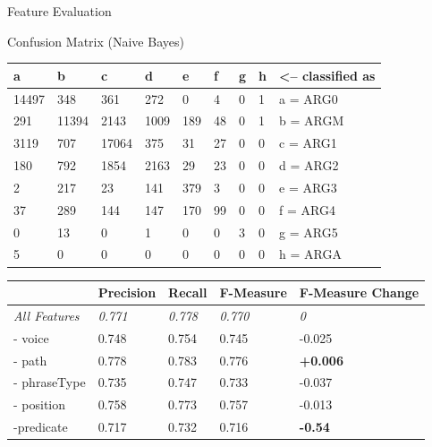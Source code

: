 \documentclass[10pt]{beamer}
\begin{document}
\begin{frame}{Feature Evaluation}

\begin{frame}{Confusion Matrix (Naive Bayes)}

\begin{table}[h]
\begin{tabular}{llllllll|l}
a     & b     & c     & d    & e   & f  & g & h & \textless-- classified as \\ \hline
14497 & 348   & 361   & 272  & 0   & 4  & 0 & 1 & a = ARG0                  \\
291   & 11394 & 2143  & 1009 & 189 & 48 & 0 & 1 & b = ARGM                  \\
3119  & 707   & 17064 & 375  & 31  & 27 & 0 & 0 & c = ARG1                  \\
180   & 792   & 1854  & 2163 & 29  & 23 & 0 & 0 & d = ARG2                  \\
2     & 217   & 23    & 141  & 379 & 3  & 0 & 0 & e = ARG3                  \\
37    & 289   & 144   & 147  & 170 & 99 & 0 & 0 & f = ARG4                  \\
0     & 13    & 0     & 1    & 0   & 0  & 3 & 0 & g = ARG5                  \\
5     & 0     & 0     & 0    & 0   & 0  & 0 & 0 & h = ARGA                 
\end{tabular}
\end{table}
\end{frame}

\begin{table}[h]
\begin{tabular}{l|lll|l}
                      & Precision      & Recall         & F-Measure      & F-Measure Change \\ \hline
\textit{All Features} & \textit{0.771} & \textit{0.778} & \textit{0.770} & \textit{0}       \\ \hline
- voice               & 0.748          & 0.754          & 0.745          & -0.025           \\
- path                & 0.778          & 0.783          & 0.776          & \textbf{+0.006}  \\
- phraseType          & 0.735          & 0.747          & 0.733          & -0.037           \\
- position            & 0.758          & 0.773          & 0.757          & -0.013           \\
-predicate            & 0.717          & 0.732          & 0.716          & \textbf{-0.54}  
\end{tabular}
\end{table}

\end{frame}
\end{document}
